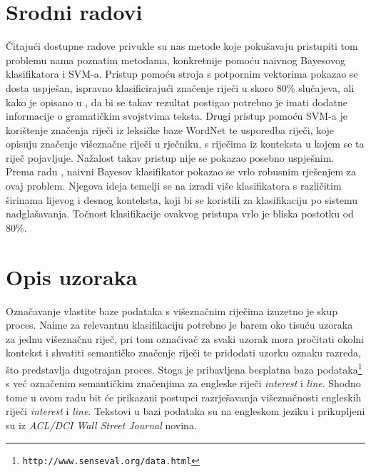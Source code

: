 \documentclass[10pt, a4paper]{article}
\begin{document}
\section{Srodni radovi}
Čitajući dostupne radove privukle su nas metode koje
pokušavaju pristupiti tom problemu nama poznatim metodama,
konkretnije pomoću naivnog Bayesovog klasifikatora i SVM-a.
Pristup pomoću stroja s potpornim vektorima pokazao se dosta
uspješan, ispravno klasificirajući značenje riječi
u skoro 80\% slučajeva, ali kako je opisano u \citep{lee-etc}, da bi se takav
rezultat postigao
potrebno je imati dodatne informacije
o gramatičkim svojstvima teksta. Drugi pristup
pomoću SVM-a je korištenje značenja  riječi
iz leksičke baze WordNet \citep{buscaldi-etc} te usporedba riječi, koje opisuju
značenje višeznačne riječi u rječniku, s riječima
iz konteksta u kojem se ta riječ pojavljuje. Nažalost takav pristup
nije se pokazao posebno uspješnim.
Prema radu \citep{pedersen}, naivni Bayesov klasifikator
pokazao se vrlo robusnim rješenjem za ovaj problem.
Njegova ideja temelji se na izradi više klasifikatora s različitim
širinama lijevog i desnog konteksta,
koji bi se koristili za klasifikaciju po sistemu nadglašavanja.
Točnost klasifikacije ovakvog pristupa vrlo je bliska postotku od 80\%.

\section{Opis uzoraka}
Označavanje vlastite baze podataka s višeznačnim riječima izuzetno je
skup proces. Naime za relevantnu klasifikaciju potrebno je barem
oko tisuću uzoraka za jednu višeznačnu riječ, pri tom
označivač za svaki uzorak mora pročitati okolni kontekst i 
shvatiti semantičko značenje riječi te pridodati uzorku oznaku razreda,
što predstavlja dugotrajan proces. Stoga je pribavljena besplatna
baza podataka\footnote{\texttt{http://www.senseval.org/data.html}} s već označenim semantičkim
značenjima za engleske riječi \emph{interest} i \emph{line}. Shodno tome u ovom radu bit će prikazani
postupci razrješavanja višeznačnosti engleskih riječi \emph{interest} i \emph{line}.
Tekstovi u bazi podataka su na engleskom jeziku
i prikupljeni su iz \emph{ACL/DCI Wall Street Journal} novina.
\end{document}
